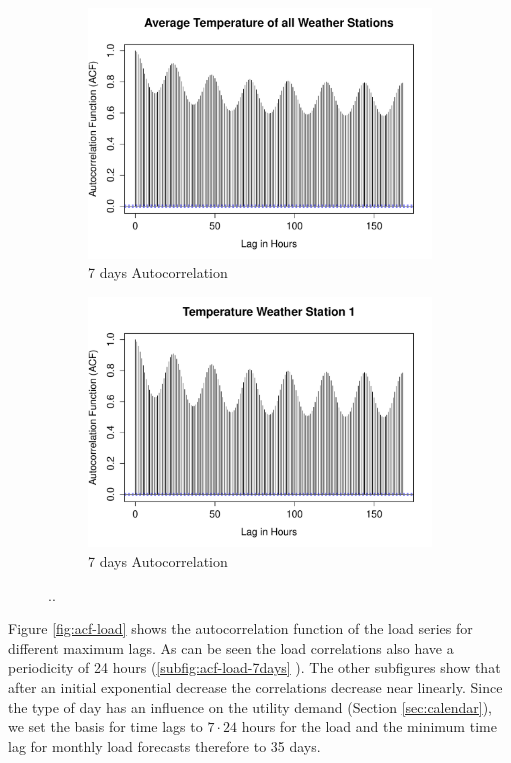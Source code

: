 \documentclass[conference]{IEEEtran}
\begin{document}
\begin{figure}[!ht]
\centering
\begin{subfigure}[b]{.49\linewidth}
\includegraphics[width=\linewidth]{gfx/acf_avg_temp_7days.pdf}
\caption{7 days Autocorrelation}
\label{subfig:avg-temp-7days}
\end{subfigure}
\begin{subfigure}[b]{.49\linewidth}
\includegraphics[width=\linewidth]{gfx/acf_temp_station1_7days.pdf}
\caption{7 days Autocorrelation}
\label{subfig:temp-station1-7days}
\end{subfigure}
\caption{..}
\label{fig:temp-lags}
\end{figure}

Figure \ref{fig:acf-load} shows the autocorrelation function of the load series for different maximum lags. As can be seen the load correlations also have a periodicity of 24 hours (\ref{subfig:acf-load-7days} ). The other subfigures show that after an initial exponential decrease the correlations decrease near linearly. Since the type of day has an influence on the utility demand (Section \ref{sec:calendar}), we set the basis for time lags to $7\cdot24$ hours for the load and the minimum time lag for monthly load forecasts therefore to 35 days.
\end{document}
